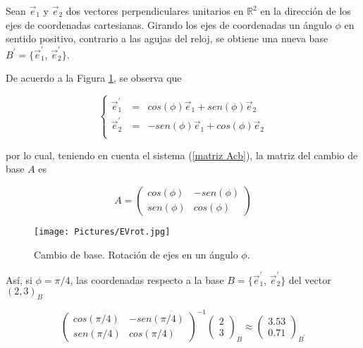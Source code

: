 \begin{example}
\label{ejrotR2}

Sean $\vec{e}_1$ y $\vec{e}_2$ dos vectores perpendiculares unitarios en $\mathbb{R}^{2}$ en la dirección de los ejes de coordenadas cartesianas. Girando los ejes de coordenadas un ángulo $\phi$ en sentido positivo, contrario a las agujas del reloj, se obtiene una nueva base  $B ^{\prime}=\{ \vec{e}_1^{\prime}$, $\vec{e}_2^{\prime}\}$.

\bigskip


\bigskip

De acuerdo a la Figura \ref{EVrot}, se observa que 


\begin{equation} \label{rot}
\left\{ \begin{array} {ccl} 
                    \vec{e}^{\prime}_1&\ =&   cos(\phi)\vec{e}_1+sen(\phi)\vec{e}_2    \\
                     \vec{e}^{\prime}_2 &\ = &-sen(\phi)\vec{e}_1+ cos(\phi)\vec{e}_2 \\
										
                   \end{array}
           \right.
\end{equation}

\bigskip
\noindent
por lo cual, teniendo en cuenta el sistema (\ref{matriz Acb}),  la matriz del cambio de base $A$ es 


\begin{equation}
\label{matrizrotR2}
A= \left(\begin{array}{cc}  cos(\phi) & -sen(\phi)  \\ sen(\phi) &  cos(\phi)
\end{array}
 \right)
\end{equation}

\begin{figure}
    \centering
    \texttt{[image: Pictures/EVrot.jpg]}
    \caption{Cambio de base. Rotación de ejes en un ángulo $\phi$.}
    \label{EVrot}
\end{figure}

\bigskip

Así, si $\phi= \pi/4$, las coordenadas respecto a la base $B=\{ \vec{e}_1^{\prime}$, $\vec{e}_2^{\prime} \}$ del vector $(2,3)_B$

\bigskip


$$\left(\begin{array}{cc}  cos(\pi/4) & -sen(\pi/4)  \\ sen(\pi/4) &  cos(\pi/4)
\end{array}
 \right)^{-1}\left(\begin{array}{c}  2 \\ 3
\end{array}
 \right)_{B}\approx \left(\begin{array}{c}  3.53 \\ 0.71
\end{array}
 \right)_{B ^{\prime}} $$
\end{example}


